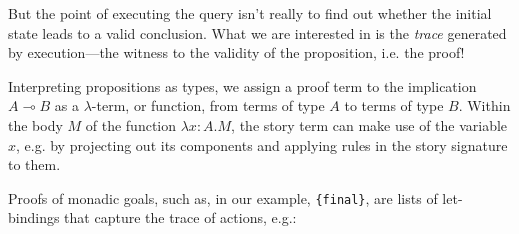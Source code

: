 \documentclass[letterpaper]{article}
\newcommand{\lolli}{\multimap}
\begin{document}
But the point of executing the query isn't really to find out whether the
initial state leads to a valid conclusion. What we are interested in is the
{\em trace} generated by execution---the witness to the validity of the
proposition, i.e. the proof!

Interpreting propositions as types, we assign a proof term to the
implication $A \lolli B$ as a $\lambda$-term, or function, from terms of
type $A$ to terms of type $B$. Within the body $M$ of the function
$\lambda{x{:}A}.M$, the story term can make use of the variable $x$, e.g.
by projecting out its components and applying rules in the story signature
to them.

Proofs of monadic goals, such as, in our example, \verb|{final}|, are lists
of let-bindings that capture the trace of actions, e.g.:


\end{document}
